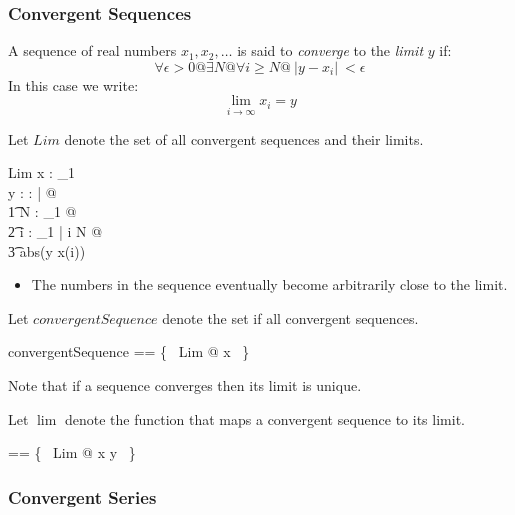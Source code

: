 \documentclass{article}
\begin{document}
\subsubsection{Convergent Sequences}

A sequence of real numbers $x_1, x_2, \ldots$ is said to {\it converge} to the {\it limit} $y$ if:
\begin{equation}
	\forall \epsilon > 0 @ \exists N @ \forall i \geq N @ ~| y - x_i|~ < \epsilon
\end{equation}
In this case we write:
\begin{equation}
\lim_{i \rightarrow \infty} x_i = y
\end{equation}

\newcommand{\realabs}{abs}


Let $Lim$ denote the set of all convergent sequences and their limits.
\begin{schema}{Lim}
	x : \nat_1 \fun \real \\
	y : \real
\where
	\forall \epsilon : \real | \epsilon \realgt \realzero @ \\
\t1		\exists N : \nat_1 @ \\
\t2			\forall i : \nat_1 | i \geq N @ \\
\t3				\realabs(y \realsub x(i)) \reallt \epsilon
\end{schema}
\begin{itemize}
\item The numbers in the sequence eventually become arbitrarily close to the limit.
\end{itemize}

Let $convergentSequence$ denote the set if all convergent sequences.
\begin{zed}
	convergentSequence == \{~ Lim @ x ~\}
\end{zed}

Note that if a sequence converges then its limit is unique.

\newcommand{\reallim}{\lim}

Let $\reallim$ denote the function that maps a convergent sequence to its limit.
\begin{zed}
	\reallim== \{~ Lim @ x \mapsto y ~\}
\end{zed}

\subsubsection{Convergent Series}
\end{document}
